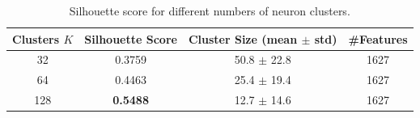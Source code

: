 \begin{table}[h]
\centering
\caption{Silhouette score for different numbers of neuron clusters.}
\label{tab:silhouette}
\begin{tabular}{cccc}
\toprule
Clusters $K$ & Silhouette Score & Cluster Size (mean $\pm$ std) & \#Features \\
\midrule
  32 & 0.3759 & 50.8 $\pm$ 22.8 & 1627 \\
  64 & 0.4463 & 25.4 $\pm$ 19.4 & 1627 \\
  128 & \textbf{0.5488} & 12.7 $\pm$ 14.6 & 1627 \\
\bottomrule
\end{tabular}
\end{table}